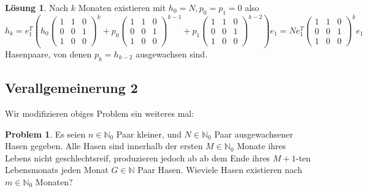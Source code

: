 \documentclass{article}
\theoremstyle{plain} %
\theoremstyle{definition} %
\newtheorem{problem}[theorem]{Problem}
\newtheorem{solution}[theorem]{Lösung}
\begin{document}
\begin{solution}
  Nach $k$ Monaten existieren mit $h_0 = N, p_0 = p_1 = 0$ also $h_k = e_1^T (h_0 \left(\begin{matrix} 1 & 1 & 0 \\ 0 & 0 & 1 \\ 1 & 0 & 0\end{matrix}\right)^k + p_0 \left(\begin{matrix} 1 & 1 & 0 \\ 0 & 0 & 1 \\ 1 & 0 & 0\end{matrix}\right)^{k-1} + p_1 \left(\begin{matrix} 1 & 1 & 0 \\ 0 & 0 & 1 \\ 1 & 0 & 0\end{matrix}\right)^{k-2})e_1 = N e_1^T \left(\begin{matrix} 1 & 1 & 0 \\ 0 & 0 & 1 \\ 1 & 0 & 0\end{matrix}\right)^k e_1$ Hasenpaare, von denen $p_k = h_{k-2}$ ausgewachsen sind.
\end{solution}

\subsection{Verallgemeinerung 2}

Wir modifizieren obiges Problem ein weiteres mal:

\begin{problem}
Es seien $n \in \mathbb{N}_0$ Paar kleiner, und $N \in \mathbb{N}_0$ Paar ausgewachsener Hasen gegeben. Alle Hasen sind innerhalb der ersten $M \in \mathbb{N}_0$ Monate ihres Lebens nicht geschlechtsreif, produzieren jedoch ab ab dem Ende ihres $M+1$-ten Lebensmonats jeden Monat $G \in \mathbb{N}$ Paar Hasen. Wieviele Hasen existieren nach $m \in \mathbb{N}_0$ Monaten?
\end{problem}
\end{document}
